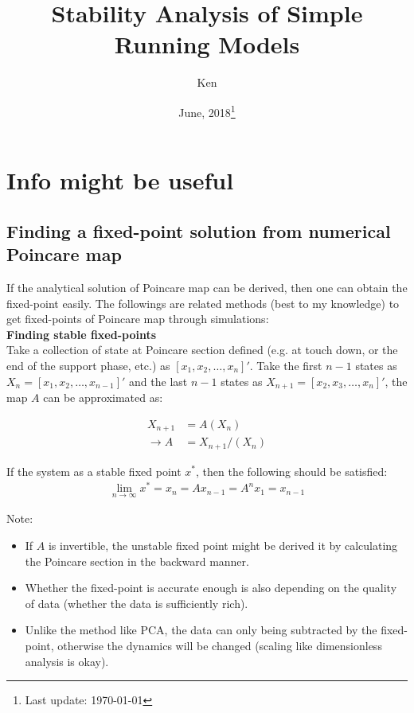 \documentclass{article}
\title{Stability Analysis of Simple Running Models}
\author{Ken}
\date{June, 2018\footnote{Last update: \today}}
\begin{document}
\maketitle













\section{Info might be useful}
\subsection{Finding a fixed-point solution from numerical Poincare map}
If the analytical solution of Poincare map can be derived, then one can obtain the fixed-point easily. The followings are related methods (best to my knowledge) to get fixed-points of Poincare map through simulations:\\

\noindent \textbf{Finding stable fixed-points}\\
Take a collection of state at Poincare section defined (e.g. at touch down, or the end of the support phase, etc.) as $[x_1,x_2,\ldots,x_n]'$. Take the first $n-1$ states as $X_n = [x_1,x_2,\ldots,x_{n-1}]'$ and the last $n-1$ states as $X_{n+1} = [x_2,x_3,\ldots,x_n]'$, the map $A$ can be approximated as:

\begin{align*}
X_{n+1} &= A(X_{n})\\
\rightarrow A &= X_{n+1}/(X_{n})
\end{align*}

\noindent If the system as a stable fixed point $x^*$, then the following should be satisfied:
\begin{align*}
\lim_{n\to\infty} x^* = x_n = Ax_{n-1} = A^nx_1 = x_{n-1}
\end{align*}

\noindent  Note:
\begin{itemize}
\item If $A$ is invertible, the unstable fixed point might be derived it by calculating the Poincare section in the  backward manner. 
\item Whether the fixed-point is accurate enough is also depending on the quality of data (whether the data is sufficiently rich).
\item Unlike the method like PCA, the data can only being subtracted by the fixed-point, otherwise the dynamics will be changed (scaling like dimensionless analysis is okay).
\end{itemize}
\end{document}
